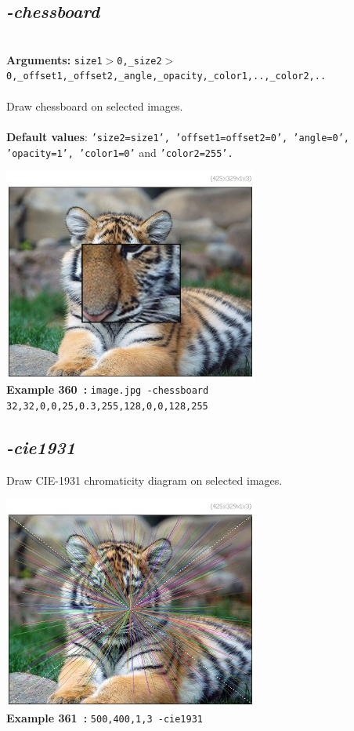 \documentclass[a4paper,11pt,twoside]{book}
\begin{document}
\subsection{\emph{-chessboard} }\vspace*{-0.5em}
~\\\textbf{Arguments: } 
{\small \texttt{size1$>$0,\_size2$>$0,\_offset1,\_offset2,\_angle,\_opacity,\_color1,..,\_color2,..}}\\~\\
Draw chessboard on selected images.
~\\~\\\textbf{Default values}: {\small \texttt{'size2=size1', 'offset1=offset2=0', 'angle=0', 'opacity=1', 'color1=0'} and \texttt{'color2=255'.}}
\begin{center}\includegraphics[keepaspectratio=true,height=7cm,width=\textwidth]{img/gmic_def360.jpg}\\
{\footnotesize \textbf{Example 360~:} \texttt{image.jpg -chessboard 32,32,0,0,25,0.3,255,128,0,0,128,255}}
\end{center}

\subsection{\emph{-cie1931} }\vspace*{-0.5em}
Draw CIE-1931 chromaticity diagram on selected images.
\begin{center}\includegraphics[keepaspectratio=true,height=7cm,width=\textwidth]{img/gmic_def361.jpg}\\
{\footnotesize \textbf{Example 361~:} \texttt{500,400,1,3 -cie1931}}
\end{center}
\end{document}
